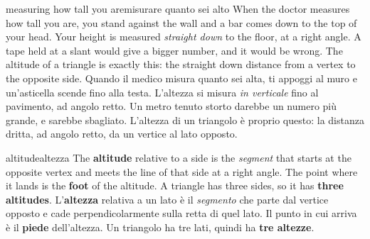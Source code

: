 \label{sec:altitudes}
\begin{anchor}{measuring how tall you are}{misurare quanto sei alto}
When the doctor measures how tall you are, you stand against the wall and a bar comes down to the top of your head. Your height is measured \emph{straight down} to the floor, at a right angle. A tape held at a slant would give a bigger number, and it would be wrong. The altitude of a triangle is exactly this: the straight down distance from a vertex to the opposite side.
\tcblower
Quando il medico misura quanto sei alta, ti appoggi al muro e un'asticella scende fino alla testa. L'altezza si misura \emph{in verticale} fino al pavimento, ad angolo retto. Un metro tenuto storto darebbe un numero più grande, e sarebbe sbagliato. L'altezza di un triangolo è proprio questo: la distanza dritta, ad angolo retto, da un vertice al lato opposto.
\end{anchor}

\begin{defn}{altitude}{altezza}
The \textbf{altitude} relative to a side is the \emph{segment} that starts at the opposite vertex and meets the line of that side at a right angle. The point where it lands is the \textbf{foot} of the altitude. A triangle has three sides, so it has \textbf{three altitudes}.
\tcblower
L'\textbf{altezza} relativa a un lato è il \emph{segmento} che parte dal vertice opposto e cade perpendicolarmente sulla retta di quel lato. Il punto in cui arriva è il \textbf{piede} dell'altezza. Un triangolo ha tre lati, quindi ha \textbf{tre altezze}.
\end{defn}

